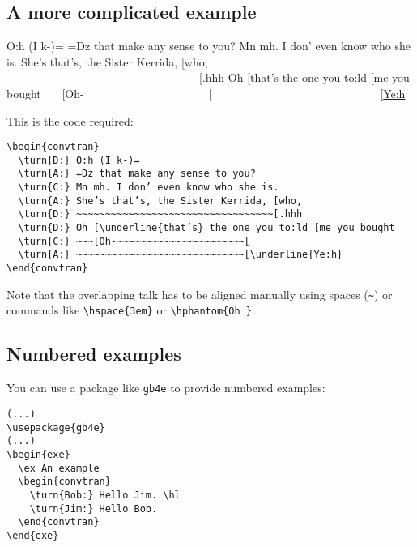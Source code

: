 \documentclass[a4paper]{article}
\begin{document}
\subsection{A more complicated example}
\begin{convtran}
   O:h (I k-)=
   =Dz that make any sense to you?
   Mn mh. I don’ even know who she is.
   She’s that’s, the Sister Kerrida, [who,
   ~~~~~~~~~~~~~~~~~~~~~~~~~~~~~~~~~~[.hhh
   Oh [\underline{that’s} the one you to:ld [me you bought
   ~~~[Oh-~~~~~~~~~~~~~~~~~~~~~~[
   ~~~~~~~~~~~~~~~~~~~~~~~~~~~~~[\underline{Ye:h}
\end{convtran}
This is the code required:
\begin{verbatim}
\begin{convtran}
  \turn{D:} O:h (I k-)=
  \turn{A:} =Dz that make any sense to you?
  \turn{C:} Mn mh. I don’ even know who she is.
  \turn{A:} She’s that’s, the Sister Kerrida, [who,
  \turn{D:} ~~~~~~~~~~~~~~~~~~~~~~~~~~~~~~~~~~[.hhh
  \turn{D:} Oh [\underline{that’s} the one you to:ld [me you bought
  \turn{C:} ~~~[Oh-~~~~~~~~~~~~~~~~~~~~~~[
  \turn{A:} ~~~~~~~~~~~~~~~~~~~~~~~~~~~~~[\underline{Ye:h}
\end{convtran}
\end{verbatim}
Note that the overlapping talk has to be aligned manually using spaces
(\verb!~!) or commands like \verb!\hspace{3em}! or \verb!\hphantom{Oh }!.

\subsection{Numbered examples}
You can use a package like \verb!gb4e! to provide numbered examples:
\begin{verbatim}
(...)
\usepackage{gb4e}
(...)
\begin{exe}
  \ex An example
  \begin{convtran}
    \turn{Bob:} Hello Jim. \hl
    \turn{Jim:} Hello Bob.
  \end{convtran}
\end{exe}
\end{verbatim}
\end{document}
